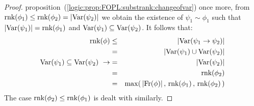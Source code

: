 \begin{proof}
proposition~(\ref{logic:prop:FOPL:substrank:changeofvar}) once more,
from  $\mbox{\rm rnk}(\phi_{1})\leq\mbox{\rm rnk}(\phi_{2})=|\mbox{\rm Var}(\psi_{2})|$ we obtain
the existence of $\psi_{1}\sim\phi_{1}$ such that
$|\mbox{\rm Var}(\psi_{1})|=\mbox{\rm rnk}(\phi_{1})$ and
$\mbox{\rm Var}(\psi_{1})\subseteq\mbox{\rm Var}(\psi_{2})$. It follows that:
    \begin{eqnarray*}
    \rnk(\phi)&\leq&|\var(\psi_{1}\to\psi_{2})|\\
    &=&|\var(\psi_{1})\cup\var(\psi_{2})|\\
    \var(\psi_{1})\subseteq\var(\psi_{2})\ \rightarrow&=&|\var(\psi_{2})|\\
    &=&\rnk(\phi_{2})\\
    &=&\max(\,|\free(\phi)|\,,\,\rnk(\phi_{1})\,,\,\rnk(\phi_{2})\,)
    \end{eqnarray*}
The case $\mbox{\rm rnk}(\phi_{2})\leq\mbox{\rm rnk}(\phi_{1})$ is dealt with similarly.
\end{proof}



